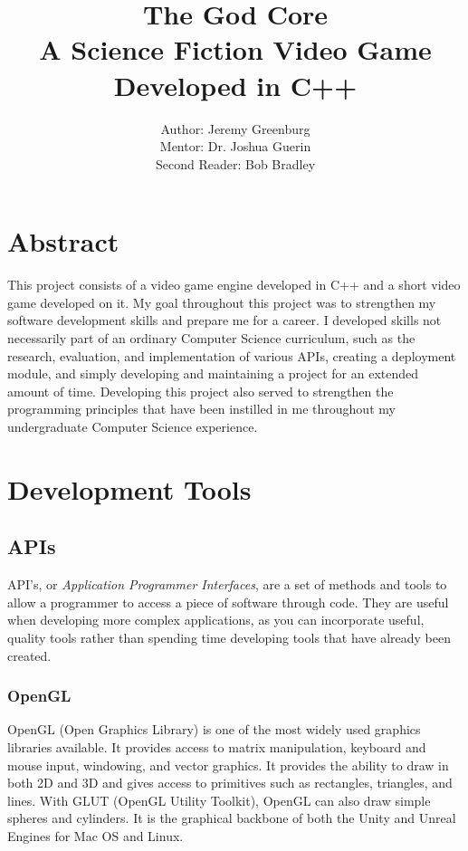 \documentclass{article}
\author{Author: Jeremy Greenburg \\ Mentor: Dr. Joshua Guerin \\ Second Reader: Bob Bradley}
\title{The God Core \\ A Science Fiction Video Game Developed in C++}
\begin{document}
\maketitle
\pagebreak

\tableofcontents

\pagebreak

\section{Abstract}

This project consists of a video game engine developed in C++ and a short video game developed on it. My goal throughout this project was to strengthen my software development skills and prepare me for a career. I developed skills not necessarily part of an ordinary Computer Science curriculum, such as the research, evaluation, and implementation of various APIs, creating a deployment module, and simply developing and maintaining a project for an extended amount of time. Developing this project also served to strengthen the programming principles that have been instilled in me throughout my undergraduate Computer Science experience.

\pagebreak

\section{Development Tools} \label{sec:DevelopmentTools}

\subsection{APIs} \label{subsec:API}

API's, or \emph{Application Programmer Interfaces}, are a set of methods and tools to allow a programmer to access a piece of software through code. They are useful when developing more complex applications, as you can incorporate useful, quality tools rather than spending time developing tools that have already been created.

\subsubsection{OpenGL} \label{subsubsec:OpenGL}

OpenGL (Open Graphics Library) is one of the most widely used graphics libraries available. It provides access to matrix manipulation, keyboard and mouse input, windowing, and vector graphics. It provides the ability to draw in both 2D and 3D and gives access to primitives such as rectangles, triangles, and lines. With GLUT (OpenGL Utility Toolkit), OpenGL can also draw simple spheres and cylinders. It is the graphical backbone of both the Unity and Unreal Engines for Mac OS and Linux.
\end{document}

